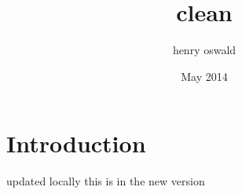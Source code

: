 \documentclass{article}
\title{clean}
\author{henry oswald}
\date{May 2014}
\begin{document}
\maketitle

\section{Introduction}
updated locally
this is in the new version 
\end{document}

